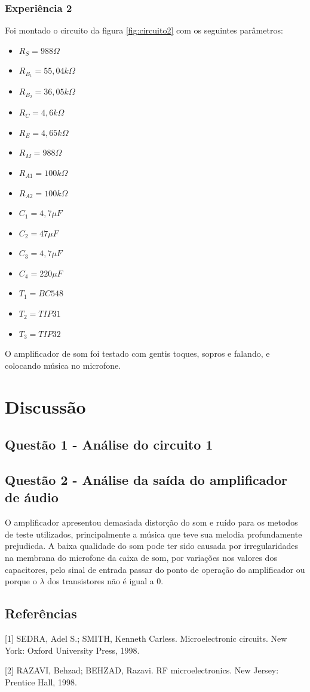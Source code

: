 \documentclass{abntex2}
\begin{document}
  \clearpage

\subsection{Experiência 2}

Foi montado o circuito da figura \ref{fig:circuito2} com os seguintes parâmetros:
\begin{itemize}
  \item $R_S = 988\Omega $
  \item $R_B_1 = 55,04k\Omega $
  \item $R_B_2 = 36,05k\Omega $
  \item $R_C = 4,6k\Omega$
  \item $R_E = 4,65k\Omega$
  \item $R_M = 988\Omega$
  \item $R_{A1} = 100k\Omega$
  \item $R_{A2} = 100k\Omega$
  \item $C_1 = 4,7 \mu F$
  \item $C_2 = 47 \mu F$
  \item $C_3 = 4,7 \mu F$
  \item $C_4 = 220 \mu F$
  \item $T_1 = BC548$
  \item $T_2 = TIP31$
  \item $T_3 = TIP32$
\end{itemize}

O amplificador de som foi testado com gentis toques, sopros e falando, e colocando música no microfone.

\chapter{Discussão}

\section{Questão 1 - Análise do circuito 1}


\section{Questão 2 - Análise da saída do amplificador de áudio}

O amplificador apresentou demasiada distorção do som e ruído para os metodos de teste utilizados, principalmente a música que teve sua melodia profundamente prejudicda. A baixa qualidade do som pode ter sido causada por irregularidades na membrana do microfone da caixa de som, por variações nos valores dos capacitores, pelo sinal de entrada passar do ponto de operação do amplificador ou porque o $\lambda$ dos transistores não é igual a 0.

\clearpage

\section*{Referências}

[1] SEDRA, Adel S.; SMITH, Kenneth Carless. Microelectronic circuits. New York: Oxford University Press, 1998.

[2] RAZAVI, Behzad; BEHZAD, Razavi. RF microelectronics. New Jersey: Prentice Hall, 1998.
\end{document}
